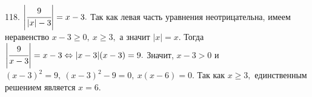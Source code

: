 118. $\left|\cfrac{9}{|x|-3}\right|=x-3.$ Так как левая часть уравнения неотрицательна, имеем неравенство $x-3\geqslant0,\ x\geqslant3,$ а значит $|x|=x.$ Тогда
$\left|\cfrac{9}{x-3}\right|=x-3\Leftrightarrow |x-3|(x-3)=9.$ Значит, $x-3>0$ и $(x-3)^2=9,\ (x-3)^2-9=0,\ x(x-6)=0.$ Так как $x\geqslant3,$ единственным решением является $x=6.$\\
